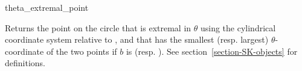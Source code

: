 {%
\color{cyan}
\begin{ccRefFunction}{theta_extremal_point}


{Returns the point on the circle that is extremal in $\theta$ using the cylindrical coordinate system
relative to , and that has the smallest (resp. largest)
  $\theta$-coordinate of the two points if $b$ is  (resp. ).
  See section~\ref{section-SK-objects} for definitions.
}

\end{ccRefFunction}
}%



